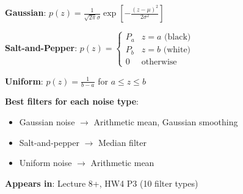 \documentclass[10pt]{article}
\begin{document}
\begin{conceptbox}

\begin{formulabox}
\textbf{Gaussian}: $p(z) = \frac{1}{\sqrt{2\pi}\sigma}\exp\left[-\frac{(z-\mu)^2}{2\sigma^2}\right]$

\textbf{Salt-and-Pepper}: $p(z) = \begin{cases} P_a & z = a \text{ (black)} \\ P_b & z = b \text{ (white)} \\ 0 & \text{otherwise} \end{cases}$

\textbf{Uniform}: $p(z) = \frac{1}{b-a}$ for $a \le z \le b$
\end{formulabox}

\begin{examplebox}
\textbf{Best filters for each noise type}:
\begin{itemize}[leftmargin=1.5em, itemsep=0pt, topsep=2pt]
    \item Gaussian noise $\to$ Arithmetic mean, Gaussian smoothing
    \item Salt-and-pepper $\to$ Median filter
    \item Uniform noise $\to$ Arithmetic mean
\end{itemize}
\end{examplebox}

\textbf{Appears in}: Lecture 8+, HW4 P3 (10 filter types)

\end{conceptbox}

\end{document}
